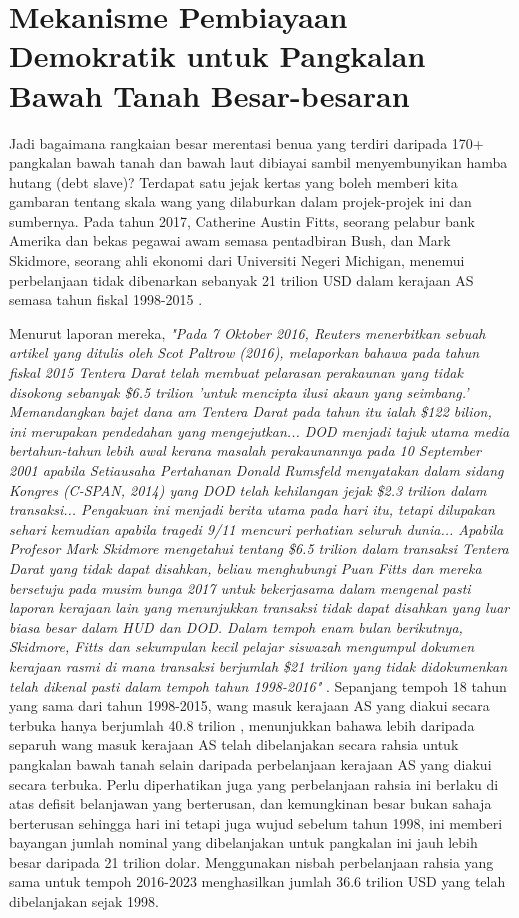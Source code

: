 \documentclass[10pt,twocolumn,letterpaper]{article}
\begin{document}
\section{Mekanisme Pembiayaan Demokratik untuk Pangkalan Bawah Tanah Besar-besaran}

Jadi bagaimana rangkaian besar merentasi benua yang terdiri daripada 170+ pangkalan bawah tanah dan bawah laut dibiayai sambil menyembunyikan hamba hutang (debt slave)? Terdapat satu jejak kertas yang boleh memberi kita gambaran tentang skala wang yang dilaburkan dalam projek-projek ini dan sumbernya. Pada tahun 2017, Catherine Austin Fitts, seorang pelabur bank Amerika dan bekas pegawai awam semasa pentadbiran Bush, dan Mark Skidmore, seorang ahli ekonomi dari Universiti Negeri Michigan, menemui perbelanjaan tidak dibenarkan sebanyak 21 trilion USD dalam kerajaan AS semasa tahun fiskal 1998-2015 \cite{11,12,13}.

Menurut laporan mereka, \textit{"Pada 7 Oktober 2016, Reuters menerbitkan sebuah artikel yang ditulis oleh Scot Paltrow (2016), melaporkan bahawa pada tahun fiskal 2015 Tentera Darat telah membuat pelarasan perakaunan yang tidak disokong sebanyak \$6.5 trilion 'untuk mencipta ilusi akaun yang seimbang.' Memandangkan bajet dana am Tentera Darat pada tahun itu ialah \$122 bilion, ini merupakan pendedahan yang mengejutkan... DOD menjadi tajuk utama media bertahun-tahun lebih awal kerana masalah perakaunannya pada 10 September 2001 apabila Setiausaha Pertahanan Donald Rumsfeld menyatakan dalam sidang Kongres (C-SPAN, 2014) yang DOD telah kehilangan jejak \$2.3 trilion dalam transaksi... Pengakuan ini menjadi berita utama pada hari itu, tetapi dilupakan sehari kemudian apabila tragedi 9/11 mencuri perhatian seluruh dunia... Apabila Profesor Mark Skidmore mengetahui tentang \$6.5 trilion dalam transaksi Tentera Darat yang tidak dapat disahkan, beliau menghubungi Puan Fitts dan mereka bersetuju pada musim bunga 2017 untuk bekerjasama dalam mengenal pasti laporan kerajaan lain yang menunjukkan transaksi tidak dapat disahkan yang luar biasa besar dalam HUD dan DOD. Dalam tempoh enam bulan berikutnya, Skidmore, Fitts dan sekumpulan kecil pelajar siswazah mengumpul dokumen kerajaan rasmi di mana transaksi berjumlah \$21 trilion yang tidak didokumenkan telah dikenal pasti dalam tempoh tahun 1998-2016"} \cite{12}.
Sepanjang tempoh 18 tahun yang sama dari tahun 1998-2015, wang masuk kerajaan AS yang diakui secara terbuka hanya berjumlah 40.8 trilion \cite{15}, menunjukkan bahawa lebih daripada separuh wang masuk kerajaan AS telah dibelanjakan secara rahsia untuk pangkalan bawah tanah selain daripada perbelanjaan kerajaan AS yang diakui secara terbuka. Perlu diperhatikan juga yang perbelanjaan rahsia ini berlaku di atas defisit belanjawan yang berterusan, dan kemungkinan besar bukan sahaja berterusan sehingga hari ini tetapi juga wujud sebelum tahun 1998, ini memberi bayangan jumlah nominal yang dibelanjakan untuk pangkalan ini jauh lebih besar daripada 21 trilion dolar. Menggunakan nisbah perbelanjaan rahsia yang sama untuk tempoh 2016-2023 menghasilkan jumlah 36.6 trilion USD yang telah dibelanjakan sejak 1998.
\end{document}
